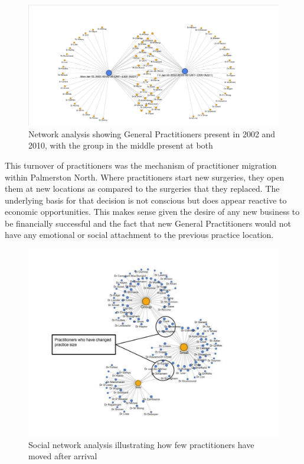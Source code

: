 \documentclass[11pt,a4paper]{article}
\begin{document}
\begin{figure}[htp]
\centering
\includegraphics[scale=0.4]{fig3.png}
\caption{Network analysis showing General Practitioners present in 2002 and 2010, with the group in the middle present at both}
\label{General Practitioners present in 2002 and 2010}
\end{figure}

This turnover of practitioners was the mechanism of practitioner migration within Palmerston North. Where practitioners start new surgeries, they open them at new locations as compared to the surgeries that they replaced. The underlying basis for that decision is not conscious but does appear reactive to economic opportunities. This makes sense given the desire of any new business to be financially successful and the fact that new General Practitioners would not have any emotional or social attachment to the previous practice location.

\begin{figure}[htp]
\centering
\includegraphics[scale=0.25]{fig4.png}
\caption{Social network analysis illustrating how few practitioners have moved after arrival}
\label{Movement of Practitioners between practices}
\end{figure}
 
\end{document}
